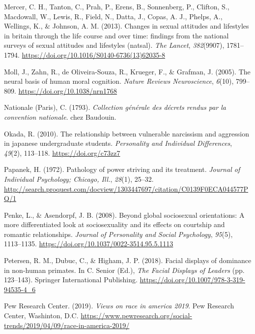 \documentclass[
  donotrepeattitle,doc, 12pt, a4paper,floatsintext]{apa7}
\newlength{\cslhangindent}
\newlength{\cslentryspacingunit} %
\newenvironment{CSLReferences}[2] %
 {%
  \setlength{\parindent}{0pt}
  \ifodd #1
  \let\oldpar\par
  \def\par{\hangindent=\cslhangindent\oldpar}
  \fi
  \setlength{\parskip}{#2\cslentryspacingunit}
 }%
 {}
\begin{document}
\begin{CSLReferences}{1}{0}
\leavevmode{}%
Mercer, C. H., Tanton, C., Prah, P., Erens, B., Sonnenberg, P., Clifton, S., Macdowall, W., Lewis, R., Field, N., Datta, J., Copas, A. J., Phelps, A., Wellings, K., \& Johnson, A. M. (2013). Changes in sexual attitudes and lifestyles in britain through the life course and over time: findings from the national surveys of sexual attitudes and lifestyles (natsal). \emph{The Lancet}, \emph{382}(9907), 1781--1794. \url{https://doi.org/10.1016/S0140-6736(13)62035-8}

\leavevmode{}%
Moll, J., Zahn, R., de Oliveira-Souza, R., Krueger, F., \& Grafman, J. (2005). The neural basis of human moral cognition. \emph{Nature Reviews Neuroscience}, \emph{6}(10), 799--809. \url{https://doi.org/10.1038/nrn1768}

\leavevmode{}%
Nationale (Paris), C. (1793). \emph{Collection générale des décrets rendus par la convention nationale}. chez Baudouin.

\leavevmode{}%
Okada, R. (2010). The relationship between vulnerable narcissism and aggression in japanese undergraduate students. \emph{Personality and Individual Differences}, \emph{49}(2), 113--118. \url{https://doi.org/c73zz7}

\leavevmode{}%
Papanek, H. (1972). Pathology of power striving and its treatment. \emph{Journal of Individual Psychology; Chicago, Ill.}, \emph{28}(1), 25--32. \url{http://search.proquest.com/docview/1303447697/citation/C0139F0ECA044577PQ/1}

\leavevmode{}%
Penke, L., \& Asendorpf, J. B. (2008). Beyond global sociosexual orientations: A more differentiated look at sociosexuality and its effects on courtship and romantic relationships. \emph{Journal of Personality and Social Psychology}, \emph{95}(5), 1113--1135. \url{https://doi.org/10.1037/0022-3514.95.5.1113}

\leavevmode{}%
Petersen, R. M., Dubuc, C., \& Higham, J. P. (2018). Facial displays of dominance in non-human primates. In C. Senior (Ed.), \emph{The Facial Displays of Leaders} (pp. 123--143). Springer International Publishing. \url{https://doi.org/10.1007/978-3-319-94535-4_6}

\leavevmode{}%
Pew Research Center. (2019). \emph{Views on race in america 2019}. Pew Research Center, Washinton, D.C. \url{https://www.pewresearch.org/social-trends/2019/04/09/race-in-america-2019/}


\end{CSLReferences}
\end{document}
